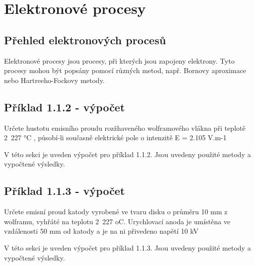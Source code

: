 \section{Elektronové procesy}

\subsection{Přehled elektronových procesů}

Elektronové procesy jsou procesy, při kterých jsou zapojeny elektrony. Tyto procesy mohou být popsány pomocí různých metod, např. Bornovy aproximace nebo Hartreeho-Fockovy metody.

\subsection{Příklad 1.1.2 - výpočet}
\begin{zadani}
    Určete hustotu emisního proudu rozžhaveného wolframového vlákna 
    při teplotě 2 227 °C , působí-li současně elektrické pole o intenzitě 
    E = 2.105 V.m-1
\end{zadani}

V této sekci je uveden výpočet pro příklad 1.1.2. Jsou uvedeny použité metody a vypočtené výsledky.

\subsection{Příklad 1.1.3 - výpočet}
\begin{zadani}
    Určete emisní proud katody vyrobené ve tvaru disku o průměru 10 mm
    z wolframu, vyhřáté na teplotu 2 227 oC. Urychlovací anoda je umístěna 
    ve vzdálenosti  50 mm  od katody a je na ni přivedeno napětí  10 kV
\end{zadani}

V této sekci je uveden výpočet pro příklad 1.1.3. Jsou uvedeny použité metody a vypočtené výsledky.